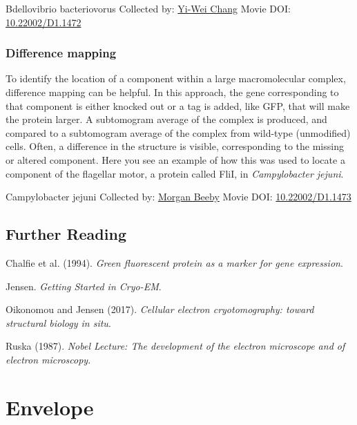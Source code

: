 \documentclass[]{tufte-book}
\begin{document}
\hypertarget{htmlwidget-2fe7a977f15235778173}{}

\label{fig:1-10}Bdellovibrio bacteriovorus Collected by: \protect\hyperlink{yi-wei_chang}{Yi-Wei Chang} Movie DOI: \href{https://doi.org/10.22002/D1.1472}{10.22002/D1.1472}

\hypertarget{Difference_mapping}{%
\subsection{Difference mapping}\label{Difference_mapping}}

To identify the location of a component within a large macromolecular complex, difference mapping can be helpful. In this approach, the gene corresponding to that component is either knocked out or a tag is added, like GFP, that will make the protein larger. A subtomogram average of the complex is produced, and compared to a subtomogram average of the complex from wild-type (unmodified) cells. Often, a difference in the structure is visible, corresponding to the missing or altered component. Here you see an example of how this was used to locate a component of the flagellar motor, a protein called FliI, in \emph{Campylobacter jejuni}.



\hypertarget{htmlwidget-290fd62e0bc4919a5f79}{}

\label{fig:1-10a}Campylobacter jejuni Collected by: \protect\hyperlink{morgan_beeby}{Morgan Beeby} Movie DOI: \href{https://doi.org/10.22002/D1.1473}{10.22002/D1.1473}

\hypertarget{further-reading}{%
\section{Further Reading}\label{further-reading}}

Chalfie et al. (1994). \emph{Green fluorescent protein as a marker for gene expression}.\citep{chalfie1994}

Jensen. \emph{Getting Started in Cryo-EM}.\citep{jensenInternet}

Oikonomou and Jensen (2017). \emph{Cellular electron cryotomography: toward structural biology in situ}.\citep{oikonomou2017}

Ruska (1987). \emph{Nobel Lecture: The development of the electron microscope and of electron microscopy}.\citep{ruska1987}

\hypertarget{envelope}{%
\chapter{Envelope}\label{envelope}}
\end{document}
